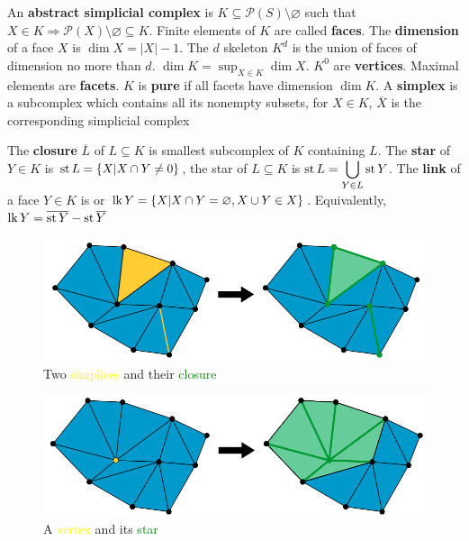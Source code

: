 \documentclass[main]{subfiles}
\begin{document}
\begin{definition}
An \textbf{abstract simplicial complex} is $K\subseteq \mathscr P(S)\setminus\varnothing$ such that $X\in K\Rightarrow\mathscr{P}(X)\setminus\varnothing\subseteq K$. Finite elements of $K$ are called \textbf{faces}. The \textbf{dimension} of a face $X$ is $\dim X=|X|-1$. The $d$ skeleton $K^d$ is the union of faces of dimension no more than $d$. $\dim K=\displaystyle\sup_{X\in K}\dim X$. $K^0$ are \textbf{vertices}. Maximal elements are \textbf{facets}. $K$ is \textbf{pure} if all facets have dimension $\dim K$. A \textbf{simplex} is a subcomplex which contains all its nonempty subsets, for $X\in K$, $\overline X$ is the corresponding simplicial complex
\end{definition}

\begin{definition}
The \textbf{closure} $\overline L$ of $L\subseteq K$ is smallest subcomplex of $K$ containing $L$. The \textbf{star} of $Y\in K$ is $\operatorname{st} L=\{X|X\cap Y\neq0\}$, the star of $L\subseteq K$ is $\operatorname{st} L=\displaystyle\bigcup_{Y\in L}\operatorname{st} Y$. The \textbf{link} of a face $Y\in K$ is or $\operatorname{lk} Y=\{X|X\cap Y=\varnothing, X\cup Y\in X\}$. Equivalently, $\operatorname{lk} Y=\overline{\operatorname{st} Y}-\operatorname{st}\overline Y$
\begin{figure}[h!]
\centering
\includegraphics[scale=0.2]{Pictures/Closure_of_a_complex}
\caption{Two \textcolor{yellow}{simplices} and their \textcolor{green}{closure}}\label{Closure of a complex}
\end{figure}
\begin{figure}[h!]
\centering
\includegraphics[scale=0.2]{Pictures/Star_of_a_complex}
\caption{A \textcolor{yellow}{vertex} and its \textcolor{green}{star}}\label{Star of a complex}

\end{figure}
\end{definition}
\end{document}
